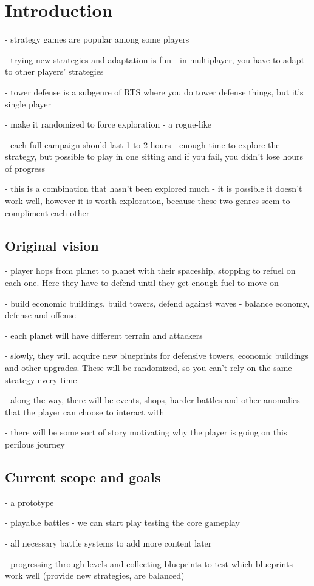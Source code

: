 \chapter{Introduction}

- strategy games are popular among some players

- trying new strategies and adaptation is fun - in multiplayer, you have to adapt to other players' strategies

- tower defense is a subgenre of RTS where you do tower defense things, but it's single player

- make it randomized to force exploration - a rogue-like

- each full campaign should last 1 to 2 hours - enough time to explore the strategy, but possible to play in one sitting and if you fail, you didn't lose hours of progress

- this is a combination that hasn't been explored much - it is possible it doesn't work well, however it is worth exploration, because these two genres seem to compliment each other

\section{Original vision}

- player hops from planet to planet with their spaceship, stopping to refuel on each one. Here they have to defend until they get enough fuel to move on

- build economic buildings, build towers, defend against waves - balance economy, defense and offense

- each planet will have different terrain and attackers

- slowly, they will acquire new blueprints for defensive towers, economic buildings and other upgrades. These will be randomized, so you can't rely on the same strategy every time

- along the way, there will be events, shops, harder battles and other anomalies that the player can choose to interact with

- there will be some sort of story motivating why the player is going on this perilous journey

\section{Current scope and goals}

- a prototype

- playable battles - we can start play testing the core gameplay

- all necessary battle systems to add more content later

- progressing through levels and collecting blueprints to test which blueprints work well (provide new strategies, are balanced)

